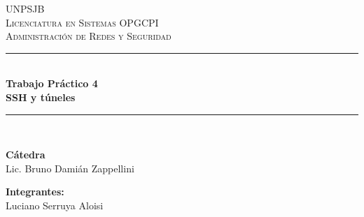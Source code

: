\begin{titlepage}

    \newcommand{\HRule}{\rule{\linewidth}{0.5mm}} %

    \center %
     

    \textsc{\LARGE UNPSJB}\\[1cm] %
    \textsc{\Large Licenciatura en Sistemas OPGCPI}\\[0.5cm] %
    \textsc{\large Administración de Redes y Seguridad}\\[0.5cm] %


    \HRule \\[0.4cm]
    {\huge \bfseries Trabajo Práctico 4}\\[0.4cm] %
    {\large \bfseries SSH y túneles}\\[0.4cm] %
    \HRule \\[1.5cm]
     


    \begin{minipage}[l]{0.5\textwidth}
        \begin{flushleft}
            \textbf{\textsf{Cátedra}}\\
            \large Lic. Bruno Damián Zappellini\\ 
            \linespread{4}
            \end{flushleft}
    \end{minipage}
    \begin{minipage}[l]{0.4\textwidth}
        \begin{flushright}
            \textbf{\textsf{Integrantes:}}\\
            \linespread{1}
            \large Luciano Serruya Aloisi\\
        \end{flushright}
    \end{minipage}\\[1.5cm]


\end{titlepage}
